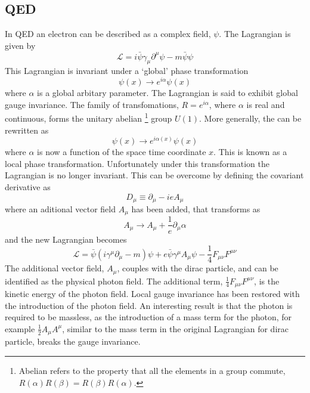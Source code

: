 \subsection{QED}
In QED an electron can be described as a complex field, $\psi$. The Lagrangian is
given by
\begin{equation}
\mathcal{L} = i \bar{\psi} \gamma_{\mu} \partial^{\mu} \psi - m \bar{\psi}\psi
\end{equation}
This Lagrangian is invariant under a `global' phase transformation
\begin{equation}
\psi(x) \to e^{i\alpha} \psi(x)
\label{eq:global}
\end{equation}
where $\alpha$ is a global arbitary parameter. The Lagrangian is said to exhibit
global gauge invariance. The family of transfomations, $R =
e^{i \alpha}$, where $\alpha$ is real and continuous, forms the unitary
abelian \footnote{Abelian refers to the property that all the elements in a
group commute, $R(\alpha)R(\beta) = R(\beta)R(\alpha)$.}
group $U(1)$. 
More generally, the  can be rewritten as 
\begin{equation}
\psi(x) \to e^{i\alpha(x)} \psi(x)
\label{eq:local}
\end{equation}
where $\alpha$ is now a function of the space time coordinate $x$. This is known
as a local phase transformation. Unfortunately under this transformation the
Lagrangian is no longer invariant. This can be overcome by defining the
covariant derivative as 
\begin{equation}
D_{\mu} \equiv \partial_{\mu} - i e A_{\mu}
\end{equation}
where an aditional vector field $A_{\mu}$ has been added, that transforms as 
\begin{equation}
A_{\mu} \to A_{\mu} + \frac{1}{e} \partial_{\mu} \alpha
\end{equation}
and the new Lagrangian becomes
\begin{equation}
\mathcal{L} = 
\bar{\psi}(i\gamma^{\mu}\partial_{\mu} - m)\psi + 
e \bar{\psi} \gamma^{\mu} A_{\mu} \psi - 
\frac{1}{4} F_{\mu\nu} F^{\mu\nu}
\end{equation}
The additional vector field, $A_{\mu}$, couples with the dirac
particle, and can be identified as the physical photon field. The additional
term, $\frac{1}{4} F_{\mu\nu} F^{\mu\nu}$, is the kinetic energy of the photon
field. Local gauge invariance has been restored with the introduction of the photon
field. An interesting result is that the photon is required to be massless, as the introduction of
a mass term for the photon, for example $\frac{1}{2}A_{\mu}A^{\mu}$,
similar to the mass term in the original Lagrangian for dirac particle, breaks
the gauge invariance.

